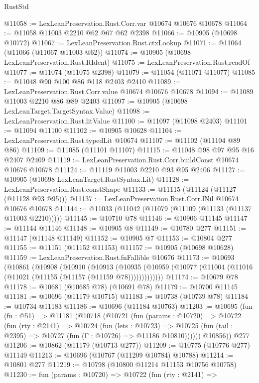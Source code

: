 \begin{lexlean}{RustStd}
\begin{coremodule}
@11058 := LexLeanPreservation.Rust.Corr.var @10674 @10676 @10678
@11064 := @11058 @11003 @2210 @62 @67 @62 @2398
@11066 := @10905 (@10698 @10772)
@11067 := LexLeanPreservation.Rust.ctxLookup
@11071 := @11064 (@11066 (@11067 @11003 @62))
@11074 := @10905 (@10698 LexLeanPreservation.Rust.RIdent)
@11075 := LexLeanPreservation.Rust.readOf
@11077 := @11074 (@11075 @2398)
@11079 := @11054 (@11071 @11077)
@11085 := @11048 @90 @100 @86 @118 @2403 @2410
@11089 := LexLeanPreservation.Rust.Corr.value @10674 @10676 @10678
@11094 := @11089 @11003 @2210 @86 @89 @2403
@11097 := @10905 (@10698 LexLeanTarget.TargetSyntax.Value)
@11098 := LexLeanPreservation.Rust.litValue
@11100 := @11097 (@11098 @2403)
@11101 := @11094 @11100
@11102 := @10905 @10628
@11104 := LexLeanPreservation.Rust.typedLit @10674
@11107 := @11102 (@11104 @89 @86)
@11109 := @11085 (@11101 @11107)
@11115 := @11048 @98 @97 @95 @16 @2407 @2409
@11119 := LexLeanPreservation.Rust.Corr.buildConst @10674 @10676 @10678
@11124 := @11119 @11003 @2210 @93 @95 @2406
@11127 := @10905 (@10698 LexLeanTarget.RustSyntax.Lit)
@11128 := LexLeanPreservation.Rust.constShape
@11133 := @11115 (@11124 (@11127 (@11128 @93 @95)))
@11137 := LexLeanPreservation.Rust.Corr.lNil @10674 @10676 @10678
@11144 := @11033 (@11042 (@11079 (@11109 (@11133 (@11137 @11003 @2210)))))
@11145 := @10710 @78
@11146 := @10906 @11145
@11147 := @11144 @11146
@11148 := @10905 @8
@11149 := @10780 @277
@11151 := @11147 (@11148 @11149)
@11152 := @10905 @7
@11153 := @10804 @277
@11155 := @11151 (@11152 @11153)
@11157 := @10905 (@10698 @10628)
@11159 := LexLeanPreservation.Rust.fnFallible @10676
@11173 := @10693
    (@10861
      (@10908
        (@10910
          (@10913
            (@10935 (@10959 (@10977 (@11004 (@11016 (@11021 (@11155 (@11157 (@11159 @78)))))))))))))
@11174 := @10679 @78
@11178 := @10681 (@10685 @78) (@10691 @78)
@11179 := @10700 @11145
@11181 := @10696 (@11179 @10715)
@11183 := @10738 (@10739 @78)
@11184 := @10734 @11183
@11186 := @10696 (@11184 @10763)
@11203 := @10695
    (fun (fn : @51) =>
    @11181
      (@10718
        (@10721
          (fun (params : @10720) =>
          @10722
            (fun (rty : @2141) =>
            @10724
              (fun (lets : @10723) =>
              @10725 (fun (tail : @2395) => @10727 (fun (Γ : @10726) => @11186 @10810))))))
        @10856))
    @277
@11206 := @10862 (@11179 (@10713 @277))
@11209 := @10775 (@10776 @277) @11149
@11213 := @10696 (@10767 (@11209 @10784) @10788)
@11214 := @10801 @277
@11219 := @10798 (@10800 @11214 @11153 @10756 @10758)
@11230 := fun (params : @10720) =>
  @10722
    (fun (rty : @2141) =>

\end{coremodule}
\end{lexlean}
